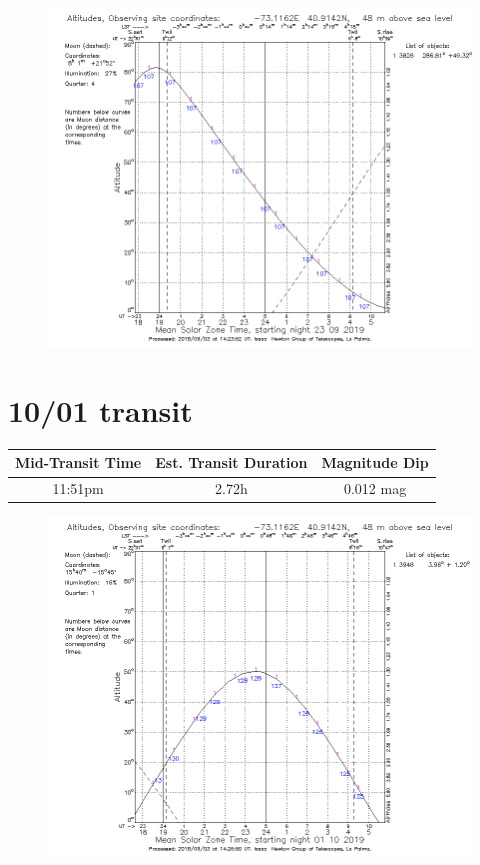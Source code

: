 \documentclass{article}[12pt]
\begin{document}
\begin{figure}[h]
	\includegraphics[width=\linewidth]{3826_9_23.png}
\end{figure}

\newpage

\section{10/01 transit}

\begin{table}[h]
	\begin{center}
		\begin{tabular}{|c | c | c|}
			\hline
			Mid-Transit Time & Est. Transit Duration & Magnitude Dip \\
			\hline
			\hline
			11:51pm & 2.72h & 0.012 mag\\
			\hline
		\end{tabular}
	\end{center}
\end{table}

\begin{figure}[h]
	\includegraphics[width=\linewidth]{3946_10_01.png}
\end{figure}
\end{document}
